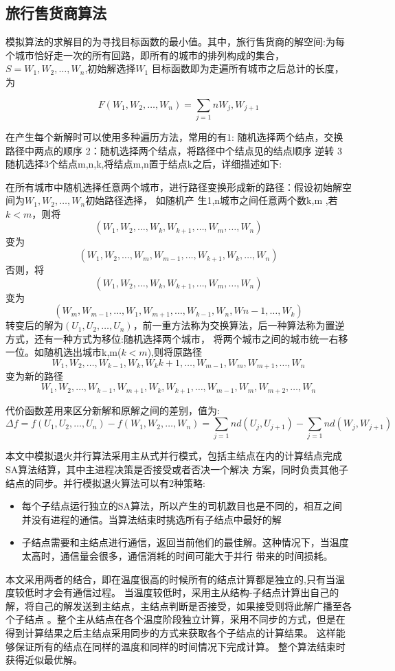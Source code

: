 \subsection{旅行售货商算法}
    模拟算法的求解目的为寻找目标函数的最小值。其中，旅行售货商的解空间:为每个城市恰好走一次的所有回路，即所有的城市的排列构成的集合，$S={W_1,W_2,\ldots,W_n}$,初始解选择$W_1$
    目标函数即为走遍所有城市之后总计的长度\cite{}，为

    $$F(W_1,W_2,\ldots,W_n)=\sum_{j=1}{n}{W_j,W_{j+1}}$$

在产生每个新解时可以使用多种遍历方法，常用的有1: 随机选择两个结点，交换路径中两点的顺序 2：随机选择两个结点，将路径中个结点见的结点顺序
逆转 3 随机选择3个结点m,n,k,将结点m,n置于结点k之后，详细描述如下:
    
在所有城市中随机选择任意两个城市，进行路径变换形成新的路径：假设初始解空间为${W_1,W_2,\ldots,W_n}$初始路径选择， 如随机产
生1,n城市之间任意两个数k,m ,若$k<m$，则将$$(W_1,W_2,\ldots,W_k,W_{k+1},\ldots,W_m,\ldots,W_n)$$变为$$(W_1,W_2,\ldots,W_m,W_{m-1},\ldots,W_{k+1},W_k,\ldots,W_n) $$
    否则，将$$(W_1,W_2,\ldots,W_k,W_{k+1},\ldots,W_m,\ldots,W_n)$$变为$$(W_m,W_{m-1},\ldots,W_1,W_{m+1},\ldots,W_{k-1},W_n,W{n-1},\ldots,W_k)$$
    转变后的解为$(U_1,U_2,\ldots,U_n)$，前一重方法称为交换算法，后一种算法称为置逆方式，还有一种方式为移位:随机选择两个城市，
将两个城市之间的城市统一右移一位。如随机选出城市k,m($k<m$),则将原路径
$$W_1,W_2,\ldots,W_{k-1},W_k,W_k{k+1},\ldots,W_{m-1},W_m,W_{m+1},\ldots,W_n$$变为新的路径
$$W_1,W_2,\ldots,W_{k-1},W_{m+1},W_k,W_{k+1},\ldots,W_{m-1},W_m,W_{m+2},\ldots,W_n$$
    
代价函数差用来区分新解和原解之间的差别，值为:
    $$\Delta f =f(U_1,U_2,\ldots,U_n)-f(W_1,W_2,\ldots,W_n)=\sum_{j=1}{n}d(U_j,U_{j+1}) - \sum_{j=1}{n}d(W_j,W_{j+1})$$

    本文中模拟退火并行算法采用主从式并行模式，包括主结点在内的计算结点完成SA算法结算，其中主进程决策是否接受或者否决一个解决
方案，同时负责其他子结点的同步。并行模拟退火算法可以有2种策略:
    \begin{itemize}
    \item 每个子结点运行独立的SA算法，所以产生的司机数目也是不同的，相互之间并没有进程的通信。当算法结束时挑选所有子结点中最好的解
    \item 子结点需要和主结点进行通信，返回当前他们的最佳解。这种情况下，当温度太高时，通信量会很多，通信消耗的时间可能大于并行
        带来的时间损耗。
    \end{itemize}
    
    本文采用两者的结合，即在温度很高的时候所有的结点计算都是独立的,只有当温度较低时才会有通信过程。
当温度较低时，采用主从结构-子结点计算出自己的解，将自己的解发送到主结点，主结点判断是否接受，如果接受则将此解广播至各个子结点
。整个主从结点在各个温度阶段独立计算，采用不同步的方式，但是在得到计算结果之后主结点采用同步的方式来获取各个子结点的计算结果。
这样能够保证所有的结点在同样的温度和同样的时间情况下完成计算。 整个算法结束时获得近似最优解。

